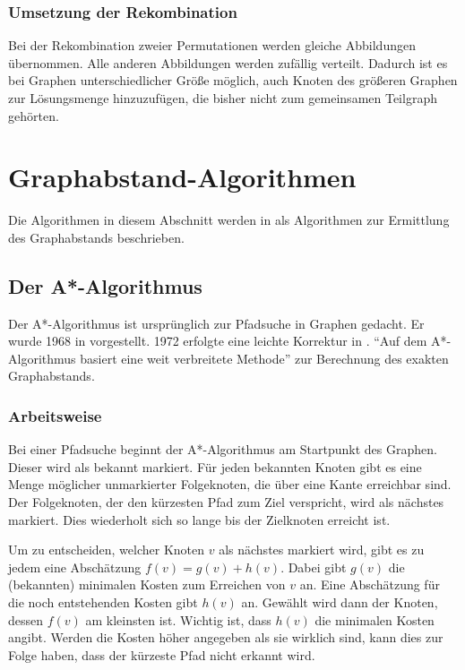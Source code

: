 \subsubsection{Umsetzung der Rekombination}
Bei der Rekombination zweier Permutationen werden gleiche Abbildungen übernommen. 
Alle anderen Abbildungen werden zufällig verteilt. Dadurch ist es bei Graphen 
unterschiedlicher Größe möglich, auch Knoten des größeren Graphen zur Lösungsmenge 
hinzuzufügen, die bisher nicht zum gemeinsamen Teilgraph gehörten.

\section{Graphabstand-Algorithmen}
Die Algorithmen in diesem Abschnitt werden in \cite{phdRiesen} als Algorithmen zur 
Ermittlung des Graphabstands beschrieben.

\subsection{Der A*-Algorithmus}
Der A*-Algorithmus ist ursprünglich zur Pfadsuche in Graphen gedacht. Er wurde 1968 
in \cite{AStarAlg} vorgestellt. 1972 erfolgte eine leichte Korrektur in 
\cite{AStarAlgCorrection}. "`Auf dem A*-Algorithmus basiert eine weit verbreitete 
Methode"' \cite{phdRiesen} zur Berechnung des exakten Graphabstands.

\subsubsection{Arbeitsweise}
Bei einer Pfadsuche beginnt der A*-Algorithmus am Startpunkt des Graphen. Dieser wird als bekannt
markiert. Für jeden bekannten Knoten gibt es eine Menge möglicher unmarkierter
Folgeknoten, die über eine Kante erreichbar sind. Der Folgeknoten, der den
kürzesten Pfad zum Ziel verspricht, wird als nächstes markiert. Dies wiederholt sich
so lange bis der Zielknoten erreicht ist.

Um zu entscheiden, welcher Knoten $v$ als nächstes markiert wird, gibt es zu jedem eine 
Abschätzung $f(v)=g(v)+h(v)$. Dabei gibt $g(v)$ die (bekannten) minimalen Kosten zum 
Erreichen von $v$ an. Eine Abschätzung für die noch entstehenden Kosten gibt $h(v)$ an. 
Gewählt wird dann der Knoten, dessen $f(v)$ am kleinsten ist. 
Wichtig ist, dass $h(v)$ die minimalen Kosten angibt. Werden die Kosten höher 
angegeben als sie wirklich sind, kann dies zur Folge haben, dass der kürzeste Pfad nicht 
erkannt wird. 


